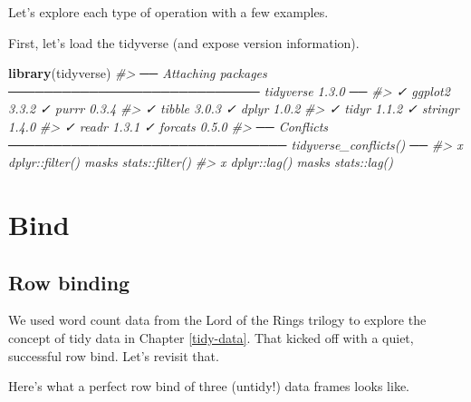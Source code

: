 \documentclass[
]{book}
\newenvironment{Shaded}{\begin{snugshade}}{\end{snugshade}}
\newcommand{\CommentTok}[1]{\textcolor[rgb]{0.56,0.35,0.01}{\textit{#1}}}
\newcommand{\KeywordTok}[1]{\textcolor[rgb]{0.13,0.29,0.53}{\textbf{#1}}}
\newcommand{\NormalTok}[1]{#1}
\begin{document}
Let's explore each type of operation with a few examples.

First, let's load the tidyverse (and expose version information).

\begin{Shaded}
\begin{Highlighting}[]
\KeywordTok{library}\NormalTok{(tidyverse)}
\CommentTok{#> ── Attaching packages ──────────────────────────── tidyverse 1.3.0 ──}
\CommentTok{#> ✓ ggplot2 3.3.2     ✓ purrr   0.3.4}
\CommentTok{#> ✓ tibble  3.0.3     ✓ dplyr   1.0.2}
\CommentTok{#> ✓ tidyr   1.1.2     ✓ stringr 1.4.0}
\CommentTok{#> ✓ readr   1.3.1     ✓ forcats 0.5.0}
\CommentTok{#> ── Conflicts ─────────────────────────────── tidyverse_conflicts() ──}
\CommentTok{#> x dplyr::filter() masks stats::filter()}
\CommentTok{#> x dplyr::lag()    masks stats::lag()}
\end{Highlighting}
\end{Shaded}

\hypertarget{bind}{%
\section{Bind}\label{bind}}

\hypertarget{row-binding}{%
\subsection{Row binding}\label{row-binding}}

We used word count data from the Lord of the Rings trilogy to explore the concept of tidy data in Chapter \ref{tidy-data}. That kicked off with a quiet, successful row bind. Let's revisit that.

Here's what a perfect row bind of three (untidy!) data frames looks like.
\end{document}
